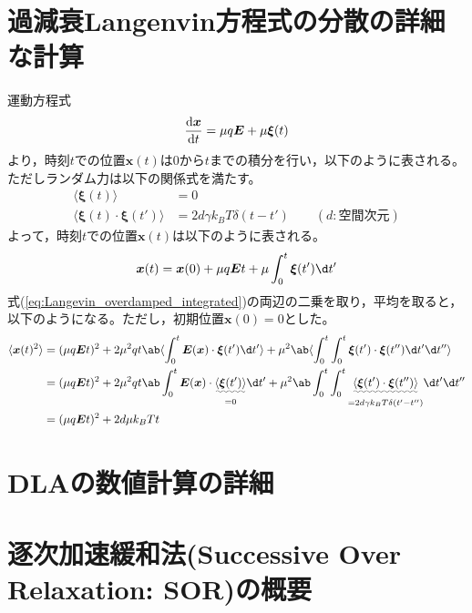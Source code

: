 \documentclass[autodetect-engine,dvi=dvipdfmx,a4paper,ja=standard,oneside,openany,11pt,draft,textwidth=50zw]{bxjsbook}
\begin{document}
\section{過減衰Langenvin方程式の分散の詳細な計算}
運動方程式
\begin{equation}
  \odv{\bm{x}}{t}=\mu q\bm{E}+\mu\bm{\xi}(t)
\end{equation}
より，時刻$t$での位置$\bm{x}(t)$は0から$t$までの積分を行い，以下のように表される。ただしランダム力は以下の関係式を満たす。
\begin{equation}
  \begin{split}
    \langle\bm{\xi}(t)\rangle                  & =0                                                   \\
    \langle\bm{\xi}(t)\cdot\bm{\xi}(t')\rangle & =2d\gamma k_B T\delta(t-t') \qquad (d:\mathrm{空間次元})
  \end{split}
  \label{eq:random_force}
\end{equation}
よって，時刻$t$での位置$\bm{x}(t)$は以下のように表される。
\begin{equation}
  \bm{x}(t)=\bm{x}(0)+\mu q\bm{E}t+\mu\int_0^t\bm{\xi}(t')\d t'
  \label{eq:Langevin_overdamped_integrated}
\end{equation}
式(\ref{eq:Langevin_overdamped_integrated})の両辺の二乗を取り，平均を取ると，以下のようになる。ただし，初期位置$\bm{x}(0)=0$とした。
\begin{equation}
  \begin{split}
    \langle\bm{x}(t)^2\rangle & =(\mu q \bm{E} t)^2+2\mu^2 q t\ab\langle\int_{0}^{t}\bm{E}(\bm{x})\cdot\bm{\xi}(t') \d t'\rangle+\mu^2\ab\langle\int_{0}^{t}\int_{0}^{t}\bm{\xi}(t')\cdot
    \bm{\xi}(t'') \d t' \d t''\rangle                                                                                                                                                                                                                            \\
                              & =(\mu q \bm{E} t)^2+2\mu^2 q t\ab\int_{0}^{t}\bm{E}(\bm{x})\cdot\underset{=0}{\uwave{\langle\bm{\xi}(t')\rangle}} \d t'+\mu^2\ab\int_{0}^{t}\int_{0}^{t}\underset{=2d\gamma k_B T\delta(t'-t'')}{\uwave{\langle\bm{\xi}(t')\cdot
    \bm{\xi}(t'')\rangle}} \d t' \d t''                                                                                                                                                                                                                          \\
                              & =(\mu q \bm{E} t)^2+2d\mu k_B T t                                                                                                                                                                                                \\
  \end{split}
  \label{eq:Langevin_overdamped_average}
\end{equation}

\section{DLAの数値計算の詳細}
\section{逐次加速緩和法(Successive Over Relaxation: SOR)の概要}

\ifdraft{
  
  
}{}
\end{document}
